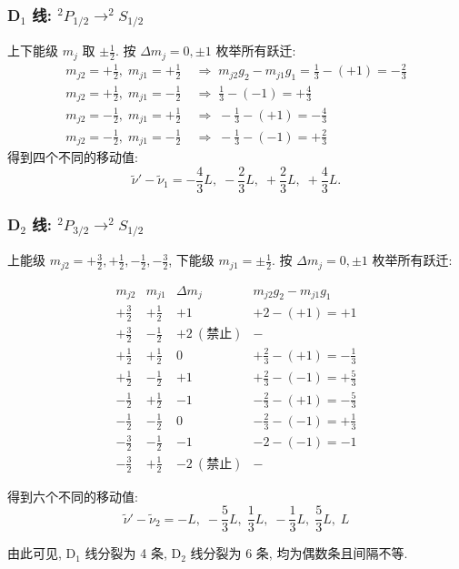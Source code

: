 \subsubsection{D$_1$ 线: $^2P_{1/2} \to ^2S_{1/2}$}
上下能级 $m_j$ 取 $\pm\frac12$. 按 $\Delta m_j = 0, \pm1$ 枚举所有跃迁:
\[
\begin{aligned}
m_{j2}=+\frac12, \; m_{j1}=+\frac12 &\;\Rightarrow\; m_{j2}g_2 - m_{j1}g_1 = \frac13 - (+1) = -\frac23 \\
m_{j2}=+\frac12, \; m_{j1}=-\frac12 &\;\Rightarrow\; \frac13 - (-1) = +\frac43 \\
m_{j2}=-\frac12, \; m_{j1}=+\frac12 &\;\Rightarrow\; -\frac13 - (+1) = -\frac43 \\
m_{j2}=-\frac12, \; m_{j1}=-\frac12 &\;\Rightarrow\; -\frac13 - (-1) = +\frac23
\end{aligned}
\]
得到四个不同的移动值:
\[
\tilde{\nu}' - \tilde{\nu}_1 = -\frac43L, \; -\frac23L, \; +\frac23L, \; +\frac43L.
\]

\subsubsection{D$_2$ 线: $^2P_{3/2} \to ^2S_{1/2}$}
上能级 $m_{j2}= +\frac32, +\frac12, -\frac12, -\frac32$, 下能级 $m_{j1}= \pm\frac12$. 按 $\Delta m_j = 0, \pm1$ 枚举所有跃迁:

\[
\renewcommand{\arraystretch}{1.8}
\begin{array}{c|c|c|c}
m_{j2} & m_{j1} & \Delta m_j & m_{j2}g_2 - m_{j1}g_1 \\ \hline
+\frac32 & +\frac12 & +1 & +2 - (+1) = +1 \\
+\frac32 & -\frac12 & +2\ (\text{禁止}) & - \\[4pt]
+\frac12 & +\frac12 & 0 & +\frac23 - (+1) = -\frac13 \\
+\frac12 & -\frac12 & +1 & +\frac23 - (-1) = +\frac53 \\[4pt]
-\frac12 & +\frac12 & -1 & -\frac23 - (+1) = -\frac53 \\
-\frac12 & -\frac12 & 0 & -\frac23 - (-1) = +\frac13 \\[4pt]
-\frac32 & -\frac12 & -1 & -2 - (-1) = -1 \\
-\frac32 & +\frac12 & -2\ (\text{禁止}) & -
\end{array}
\]

得到六个不同的移动值:
\[
\tilde{\nu}' - \tilde{\nu}_2 = -L, \; -\frac53L, \; \frac13L, \; -\frac13L, \; \frac53L, \; L
\]

由此可见, D$_1$ 线分裂为 4 条, D$_2$ 线分裂为 6 条, 均为偶数条且间隔不等.
